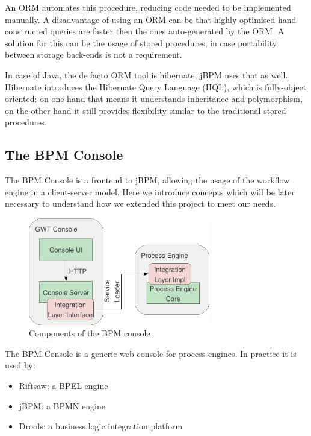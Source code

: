 An ORM automates this procedure, reducing code needed to be implemented
manually. A disadvantage of using an ORM can be that highly optimised
hand-constructed queries are faster then the ones auto-generated by the ORM. A
solution for this can be the usage of stored procedures, in case portability
between storage back-ends is not a requirement.

In case of Java, the de facto ORM tool is hibernate, jBPM uses that as well.
Hibernate introduces the Hibernate Query Language (HQL), which is fully-object
oriented: on one hand that means it understands inheritance and polymorphism,
on the other hand it still provides flexibility similar to the traditional
stored procedures.

\subsection{The BPM Console}
\label{sec:bpm-console}

The BPM Console is a frontend to jBPM, allowing the usage of the workflow
engine in a client-server model. Here we introduce concepts which will be later
necessary to understand how we extended this project to meet our needs.


\begin{figure}[H]
\centering
\includegraphics[width=300px,keepaspectratio]{bpm-console.pdf}
\caption{Components of the BPM console}
\label{fig:bpm-console}
\end{figure}

The BPM Console is a generic web console for process engines. In practice it is
used by:

\begin{itemize}
\item Riftsaw: a BPEL engine
\item jBPM: a BPMN engine
\item Drools: a business logic integration platform
\end{itemize}

